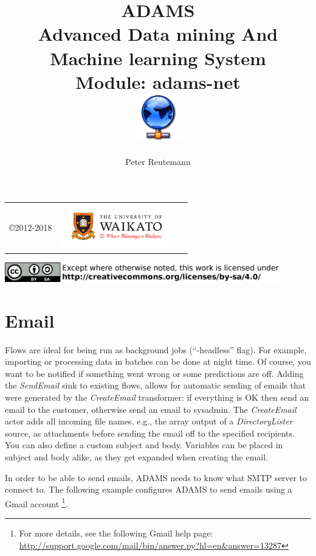 \documentclass[a4paper]{book}
\title{
  \textbf{ADAMS} \\
  {\Large \textbf{A}dvanced \textbf{D}ata mining \textbf{A}nd \textbf{M}achine
  learning \textbf{S}ystem} \\
  {\Large Module: adams-net} \\
  \vspace{1cm}
  \includegraphics[width=2cm]{images/net-module.png} \\
}
\author{
  Peter Reutemann
}
\begin{document}
\begin{titlepage}
\maketitle

\thispagestyle{empty}
\center
\begin{table}[b]
	\begin{tabular}{c l l}
		\parbox[c][2cm]{2cm}{\copyright 2012-2018} &
		\parbox[c][2cm]{5cm}{\includegraphics[width=5cm]{images/coat_of_arms.pdf}} \\
	\end{tabular}
	\includegraphics[width=12cm]{images/cc.png} \\
\end{table}

\end{titlepage}

\tableofcontents
\listoffigures


\chapter{Email}
Flows are ideal for being run as background jobs (``-headless'' flag). For
example, importing or processing data in batches can be done at night time. 
Of course, you want to be notified if something went wrong or some predictions
are off. Adding the \textit{SendEmail} sink to existing flows, allows for automatic
sending of emails that were generated by the \textit{CreateEmail} transformer: 
if everything is OK then send an email to the customer,
otherwise send an email to sysadmin. The \textit{CreateEmail} actor adds all incoming
file names, e.g., the array output of a \textit{DirectoryLister} source, as
attachments before sending the email off to the specified recipients. You can
also define a custom subject and body. Variables can be placed in subject and
body alike, as they get expanded when creating the email.

In order to be able to send emails, ADAMS needs to know what SMTP server to
connect to. The following example configures ADAMS to send emails using a Gmail
account \footnote{For more details, see the following Gmail help page: \\
\url{http://support.google.com/mail/bin/answer.py?hl=en&answer=13287}{}}. 
\end{document}
